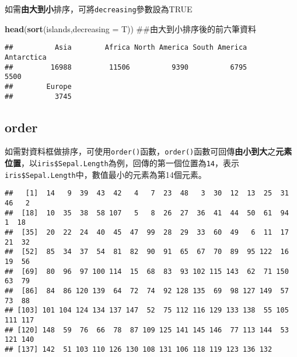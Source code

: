 \documentclass[]{book}
\newenvironment{Shaded}{\begin{snugshade}}{\end{snugshade}}
\newcommand{\KeywordTok}[1]{\textcolor[rgb]{0.13,0.29,0.53}{\textbf{{#1}}}}
\newcommand{\DataTypeTok}[1]{\textcolor[rgb]{0.13,0.29,0.53}{{#1}}}
\newcommand{\DecValTok}[1]{\textcolor[rgb]{0.00,0.00,0.81}{{#1}}}
\newcommand{\NormalTok}[1]{{#1}}
\begin{document}
如需\textbf{由大到小}排序，可將\texttt{decreasing}參數設為TRUE

\begin{Shaded}
\begin{Highlighting}[]
\KeywordTok{head}\NormalTok{(}\KeywordTok{sort}\NormalTok{(islands,}\DataTypeTok{decreasing =} \NormalTok{T)) ##由大到小排序後的前六筆資料}
\end{Highlighting}
\end{Shaded}

\begin{verbatim}
##          Asia        Africa North America South America    Antarctica 
##         16988         11506          9390          6795          5500 
##        Europe 
##          3745
\end{verbatim}

\subsection{order}\label{order}

如需對資料框做排序，可使用\texttt{order()}函數，\texttt{order()}函數可回傳\textbf{由小到大}之\textbf{元素位置}，以\texttt{iris\$Sepal.Length}為例，回傳的第一個位置為\texttt{14}，表示\texttt{iris\$Sepal.Length}中，數值最小的元素為第14個元素。

\begin{Shaded}
\end{Shaded}

\begin{verbatim}
##   [1]  14   9  39  43  42   4   7  23  48   3  30  12  13  25  31  46   2
##  [18]  10  35  38  58 107   5   8  26  27  36  41  44  50  61  94   1  18
##  [35]  20  22  24  40  45  47  99  28  29  33  60  49   6  11  17  21  32
##  [52]  85  34  37  54  81  82  90  91  65  67  70  89  95 122  16  19  56
##  [69]  80  96  97 100 114  15  68  83  93 102 115 143  62  71 150  63  79
##  [86]  84  86 120 139  64  72  74  92 128 135  69  98 127 149  57  73  88
## [103] 101 104 124 134 137 147  52  75 112 116 129 133 138  55 105 111 117
## [120] 148  59  76  66  78  87 109 125 141 145 146  77 113 144  53 121 140
## [137] 142  51 103 110 126 130 108 131 106 118 119 123 136 132
\end{verbatim}

\begin{Shaded}
\end{Shaded}
\end{document}
